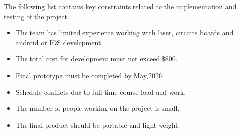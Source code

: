 The following list contains key constraints related to the implementation and testing of the project.

\begin{itemize}
  \item The team has limited experience working with laser, circuits boards and android or IOS development.
  \item The total cost for development must not exceed \$800.
  \item Final prototype must be completed by May,2020.
  \item Schedule conflicts due to full time course load and work.
  \item The number of people working on the project is small.
  \item The final product should be portable and light weight.
\end{itemize}
